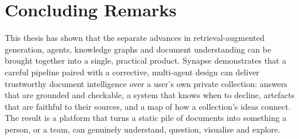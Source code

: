 \section{Concluding Remarks}

This thesis has shown that the separate advances in retrieval-augmented generation,
agents, knowledge graphs and document understanding can be brought together into a
single, practical product. Synapse demonstrates that a careful pipeline paired with
a corrective, multi-agent design can deliver trustworthy document intelligence over
a user's own private collection: answers that are grounded and checkable, a system
that knows when to decline, artefacts that are faithful to their sources, and a map
of how a collection's ideas connect. The result is a platform that turns a static
pile of documents into something a person, or a team, can genuinely understand,
question, visualise and explore.
